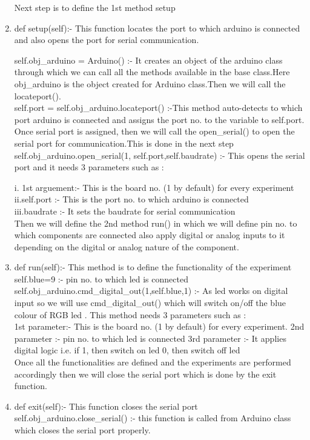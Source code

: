 \begin{enumerate}
        Next step is to define the 1st method setup \\
  \item def setup(self):- This function locates the port to which arduino is connected and
        also opens the port for serial communication.
        
        self.obj\_arduino = Arduino() :- It creates an object of the arduino class
        through which we can call all the methods available in the base class.Here 
        obj\_arduino is the object created for Arduino class.Then we will call the locateport().\\
        self.port = self.obj\_arduino.locateport() :-This method auto-detects to which port 
        arduino is connected and assigns the port no. to the variable to self.port. Once 
        serial port is assigned, then we will call the open\_serial() to open the serial 
        port for communication.This is done in the next step \\
        self.obj\_arduino.open\_serial(1, self.port,self.baudrate) :- This opens the 
        serial port and it needs 3 parameters such as :
        
        i. 1st arguement:- This is the board no. (1 by default) for every experiment \\
        ii.self.port :- This is the port no. to which arduino is connected \\
        iii.baudrate :- It sets the baudrate for serial communication \\
        
        Then we will define the 2nd method run() in which we will define pin no. to which components are connected also apply digital or analog inputs to it depending on the digital or analog nature of the component.
        
  \item def run(self):- This method is to define the functionality of the experiment \\
        self.blue=9 :- pin no. to which led is connected \\
        self.obj\_arduino.cmd\_digital\_out(1,self.blue,1) :- As led works on digital input so we will use cmd\_digital\_out() which will switch on/off the blue colour of RGB led .
        This method needs 3 parameters such as : \\
        1st parameter:- This is the board no. (1 by default) for every experiment.
        2nd parameter :- pin no. to which led is connected
        3rd parameter :- It applies digital logic i.e. if 1, then switch on led 
        0, then switch off led \\
        Once all the functionalities are defined and the experiments are performed accordingly then we will close the serial port which  is done by the exit function.
  \item def exit(self):- This function closes the serial port \\
        self.obj\_arduino.close\_serial() :- this function is called from Arduino class which closes the serial port properly.
        

\end{enumerate}
